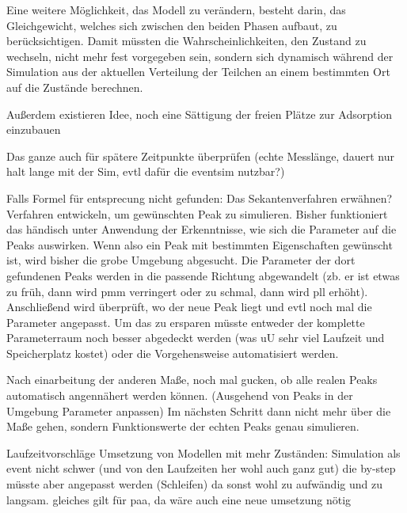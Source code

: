 Eine weitere Möglichkeit, das Modell zu verändern, besteht darin, das Gleichgewicht, welches sich zwischen den beiden Phasen aufbaut, zu berücksichtigen. Damit müssten die Wahrscheinlichkeiten, den Zustand zu wechseln, nicht mehr fest vorgegeben sein, sondern sich dynamisch während der Simulation aus der aktuellen Verteilung der Teilchen an einem bestimmten Ort auf die Zustände berechnen.

Außerdem existieren Idee, noch eine Sättigung der freien Plätze zur Adsorption einzubauen

Das ganze auch für spätere Zeitpunkte überprüfen (echte Messlänge, dauert nur halt lange mit der Sim, evtl dafür die eventsim nutzbar?)

Falls Formel für entsprecung nicht gefunden: Das Sekantenverfahren erwähnen?
Verfahren entwickeln, um gewünschten Peak zu simulieren. Bisher funktioniert das händisch unter Anwendung der Erkenntnisse, wie sich die Parameter auf die Peaks auswirken. Wenn also ein Peak mit bestimmten Eigenschaften gewünscht ist, wird bisher die grobe Umgebung abgesucht. Die Parameter der dort gefundenen Peaks werden in die passende Richtung abgewandelt (zb. er ist etwas zu früh, dann wird pmm verringert oder zu schmal, dann wird pll erhöht). Anschließend wird überprüft, wo der neue Peak liegt und evtl noch mal die Parameter angepasst. 
Um das zu ersparen müsste entweder der komplette Parameterraum noch besser abgedeckt werden (was uU sehr viel Laufzeit und Speicherplatz kostet) oder die Vorgehensweise automatisiert werden.

Nach einarbeitung der anderen Maße, noch mal gucken, ob alle realen Peaks automatisch angennähert werden können. (Ausgehend von Peaks in der Umgebung Parameter anpassen)
Im nächsten Schritt dann nicht mehr über die Maße gehen, sondern Funktionswerte der echten Peaks genau simulieren.

Laufzeitvorschläge
Umsetzung von Modellen mit mehr Zuständen: Simulation als event nicht schwer (und von den Laufzeiten her wohl auch ganz gut) die by-step müsste aber angepasst werden (Schleifen) da sonst wohl zu aufwändig und zu langsam. gleiches gilt für paa, da wäre auch eine neue umsetzung nötig
